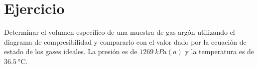 \section{Ejercicio}\label{ej:Chap03Ejercicio09}
Determinar el volumen específico de una muestra de gas argón utilizando el diagrama de compresibilidad y compararlo con el valor dado por la ecuación de estado de los gases ideales. La presión es de $\SI{1269}{kPa(a)}$ y la temperatura es de $\SI{36.5}{\celsius}$.